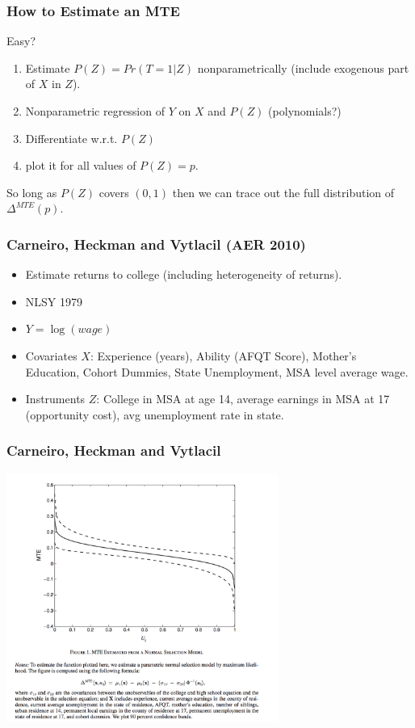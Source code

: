 \documentclass[xcolor=pdftex,dvipsnames,table,mathserif,aspectratio=169]{beamer}
\begin{document}
\begin{frame}
\frametitle{How to Estimate an MTE}
Easy?
\begin{enumerate}
\item Estimate $P(Z) = Pr(T=1 | Z)$ nonparametrically (include exogenous part of $X$ in $Z$).
\item Nonparametric regression of $Y$ on $X$ and $P(Z)$ (polynomials?)
\item Differentiate w.r.t. $P(Z)$
\item plot it for all values of $P(Z)=p$.
\end{enumerate}
So long as $P(Z)$ covers $(0,1)$ then we can trace out the full distribution of $\Delta^{MTE}(p)$.
\end{frame}



\begin{frame}
\frametitle{Carneiro, Heckman and Vytlacil (AER 2010)}
\begin{itemize}
\item Estimate returns to college (including heterogeneity of returns).
\item NLSY 1979
\item $Y = \log(wage)$
\item Covariates $X$: Experience (years), Ability (AFQT Score), Mother's Education, Cohort Dummies, State Unemployment, MSA level average wage.
\item Instruments $Z$: College in MSA at age 14, average earnings in MSA at 17 (opportunity cost), avg unemployment rate in state.
\end{itemize}
\end{frame}


\begin{frame}
\frametitle{Carneiro, Heckman and Vytlacil}
\begin{center}
\includegraphics[width=3.5in]{./resources/chv_fig1}
\end{center}
\end{frame}
\end{document}
